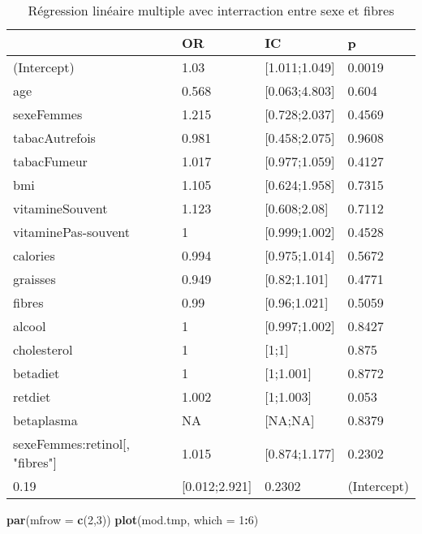 \documentclass[]{article}
\newenvironment{Shaded}{\begin{snugshade}}{\end{snugshade}}
\newcommand{\KeywordTok}[1]{\textcolor[rgb]{0.13,0.29,0.53}{\textbf{#1}}}
\newcommand{\DataTypeTok}[1]{\textcolor[rgb]{0.13,0.29,0.53}{#1}}
\newcommand{\DecValTok}[1]{\textcolor[rgb]{0.00,0.00,0.81}{#1}}
\newcommand{\OperatorTok}[1]{\textcolor[rgb]{0.81,0.36,0.00}{\textbf{#1}}}
\newcommand{\NormalTok}[1]{#1}
\begin{document}
\begin{table}

\caption{\label{tab:unnamed-chunk-84}Régression linéaire multiple avec interraction entre sexe et fibres}
\centering
\begin{tabular}[t]{l|l|l|l}
\hline
  & OR & IC & p\\
\hline
\rowcolor[HTML]{BBD2E1}  (Intercept) & 1.03 & [1.011;1.049] & 0.0019\\
\hline
age & 0.568 & [0.063;4.803] & 0.604\\
\hline
\rowcolor[HTML]{BBD2E1}  sexeFemmes & 1.215 & [0.728;2.037] & 0.4569\\
\hline
tabacAutrefois & 0.981 & [0.458;2.075] & 0.9608\\
\hline
\rowcolor[HTML]{BBD2E1}  tabacFumeur & 1.017 & [0.977;1.059] & 0.4127\\
\hline
bmi & 1.105 & [0.624;1.958] & 0.7315\\
\hline
\rowcolor[HTML]{BBD2E1}  vitamineSouvent & 1.123 & [0.608;2.08] & 0.7112\\
\hline
vitaminePas-souvent & 1 & [0.999;1.002] & 0.4528\\
\hline
\rowcolor[HTML]{BBD2E1}  calories & 0.994 & [0.975;1.014] & 0.5672\\
\hline
graisses & 0.949 & [0.82;1.101] & 0.4771\\
\hline
\rowcolor[HTML]{BBD2E1}  fibres & 0.99 & [0.96;1.021] & 0.5059\\
\hline
alcool & 1 & [0.997;1.002] & 0.8427\\
\hline
\rowcolor[HTML]{BBD2E1}  cholesterol & 1 & [1;1] & 0.875\\
\hline
betadiet & 1 & [1;1.001] & 0.8772\\
\hline
\rowcolor[HTML]{BBD2E1}  retdiet & 1.002 & [1;1.003] & 0.053\\
\hline
betaplasma & NA & [NA;NA] & 0.8379\\
\hline
\rowcolor[HTML]{BBD2E1}  sexeFemmes:retinol[, "fibres"] & 1.015 & [0.874;1.177] & 0.2302\\
\hline
0.19 & [0.012;2.921] & 0.2302 & (Intercept)\\
\hline
\end{tabular}
\end{table}

\begin{Shaded}
\begin{Highlighting}[]
\KeywordTok{par}\NormalTok{(}\DataTypeTok{mfrow =} \KeywordTok{c}\NormalTok{(}\DecValTok{2}\NormalTok{,}\DecValTok{3}\NormalTok{))}
\KeywordTok{plot}\NormalTok{(mod.tmp, }\DataTypeTok{which =} \DecValTok{1}\OperatorTok{:}\DecValTok{6}\NormalTok{)}
\end{Highlighting}
\end{Shaded}
\end{document}
